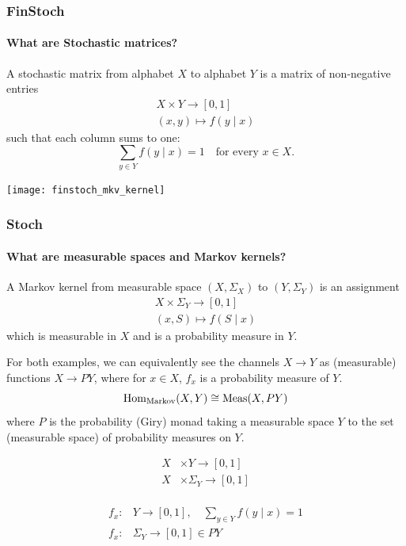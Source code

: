 \begin{frame}
    \frametitle{FinStoch}
    \framesubtitle{What are Stochastic matrices?}
    \begin{minipage}{.48\textwidth}
        A stochastic matrix from alphabet $X$ to alphabet $Y$ is a matrix of non-negative entries
        \begin{align*}
            X\times Y \to [0,1]\\
            (x, y) \mapsto f(y\mid x)
        \end{align*}
        such that each column sums to one:
        \[
            \sum_{y\in Y} f(y\mid x) = 1 \quad \text{for every $x\in X$.}
        \]
    \end{minipage}\pause
    \hfill
    \begin{minipage}{.48\textwidth}
        \texttt{[image: finstoch\_mkv\_kernel]}
    \end{minipage}
\end{frame}

\begin{frame}
    \frametitle{Stoch}
    \framesubtitle{What are measurable spaces and Markov kernels?}
    A Markov kernel from measurable space $(X, \Sigma_X)$ to $(Y, \Sigma_Y)$ is an assignment
    \begin{align*}
        X\times \Sigma_Y \to [0, 1]\\
        (x, S) \mapsto f(S\mid x)
    \end{align*}
    which is measurable in $X$ and is a probability measure in $Y$.
\end{frame}

\begin{frame}
    For both examples, we can equivalently see the channels $X\to Y$ as (measurable) functions $X\to PY$, where for $x\in X$, $f_x$ is a probability measure of $Y$.\pause
    \[
        \text{\normalfont Hom} _\text{\normalfont Markov} (X, Y) \cong \text{\normalfont Meas} (X, PY)
    \]
    where $P$ is the probability (Giry) monad taking a measurable space $Y$ to the set (measurable space) of probability measures on $Y$.\pause

    \begin{minipage}{.3\textwidth}
        \begin{align*}
            X&\times Y \to [0, 1]\\
            X&\times \Sigma_Y \to [0, 1]\\
        \end{align*}
    \end{minipage}
    \hfill
    \begin{minipage}{.6\textwidth}
        \begin{align*}
            f_x: &Y\to [0, 1],\quad \sum\nolimits_{y\in Y} f(y \mid x) = 1\\
            f_x: &\Sigma_Y\to [0, 1] \in PY \\
        \end{align*}
    \end{minipage}
    
\end{frame}

